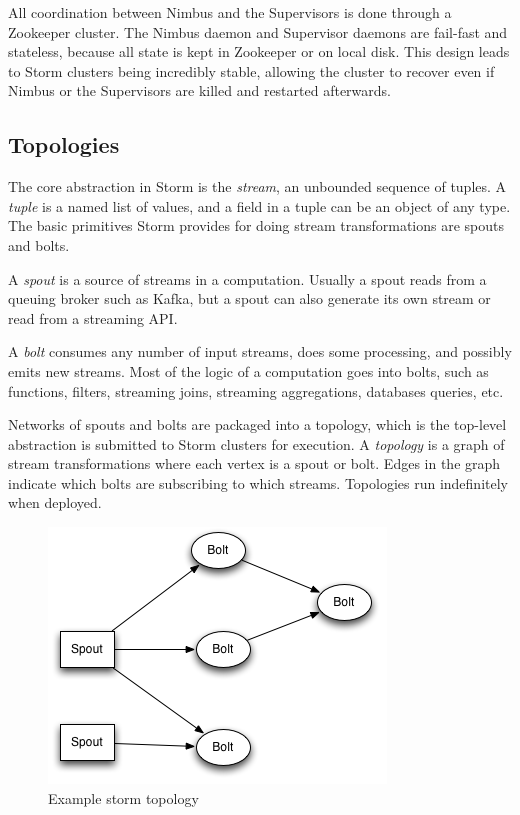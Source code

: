 All coordination between Nimbus and the Supervisors is done through a Zookeeper cluster. The Nimbus daemon and Supervisor daemons are fail-fast and stateless, because all state is kept in Zookeeper or on local disk. This design leads to Storm clusters being incredibly stable, allowing the cluster to recover even if Nimbus or the Supervisors are killed and restarted afterwards.

\subsection{Topologies}

The core abstraction in Storm is the \emph{stream}, an unbounded sequence of tuples. A \emph{tuple} is a named list of values, and a field in a tuple can be an object of any type. The basic primitives Storm provides for doing stream transformations are spouts and bolts.

A \emph{spout} is a source of streams in a computation. Usually a spout reads from a queuing broker such as Kafka, but a spout can also generate its own stream or read from a streaming API.

A \emph{bolt} consumes any number of input streams, does some processing, and possibly emits new streams. Most of the logic of a computation goes into bolts, such as functions, filters, streaming joins, streaming aggregations, databases queries, etc.

Networks of spouts and bolts are packaged into a topology, which is the top-level abstraction is submitted to Storm clusters for execution. A \emph{topology} is a graph of stream transformations where each vertex is a spout or bolt. Edges in the graph indicate which bolts are subscribing to which streams. Topologies run indefinitely when deployed.

\begin{figure}[h!]
\centering
\includegraphics{figures/storm_topology}
\caption{Example storm topology}
\label{figure:storm_topology}
\end{figure}

